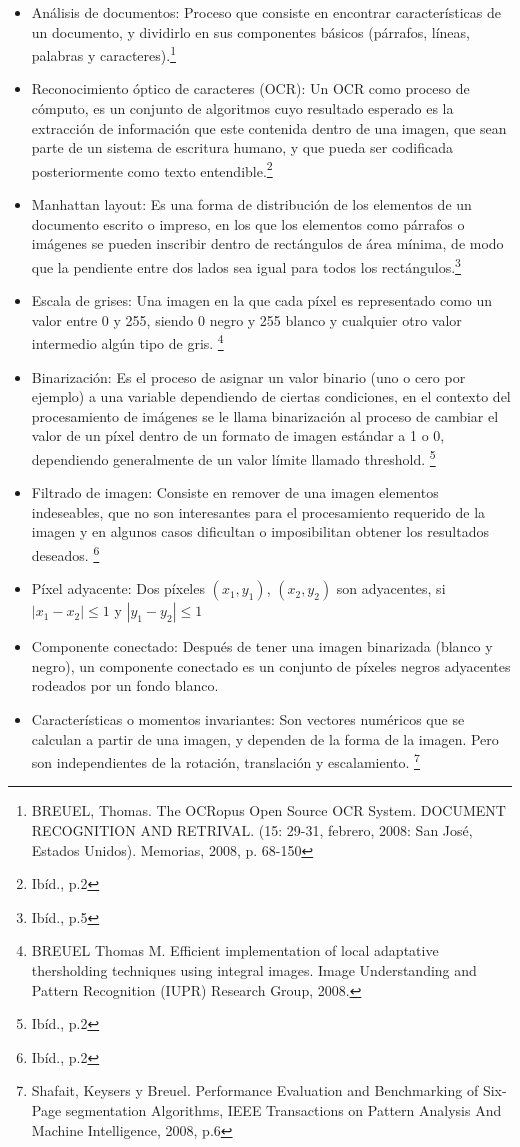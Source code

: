 \documentclass[a4paper, 11pt, oneside]{report}
\begin{document}
\begin{itemize}
\item Análisis de documentos: Proceso que consiste en encontrar características de un documento,
y dividirlo en sus componentes básicos (párrafos, líneas, palabras y caracteres).\footnote{BREUEL,
Thomas. The OCRopus Open Source OCR System. DOCUMENT RECOGNITION AND RETRIVAL. (15: 29-31, febrero,
2008: San José, Estados Unidos). Memorias, 2008, p. 68-150}
\item Reconocimiento óptico de caracteres (OCR): Un OCR como proceso de cómputo, es un conjunto de
algoritmos cuyo resultado esperado es la extracción de información que este contenida dentro de
una imagen, que sean parte de un sistema de escritura humano, y que pueda ser codificada
posteriormente como texto entendible.\footnote{Ibíd., p.2}
\item Manhattan layout: Es una forma de distribución de los elementos de un documento escrito o
impreso, en los que los elementos como párrafos o imágenes se pueden inscribir
dentro de rectángulos de área mínima, de modo que la pendiente entre dos lados sea igual para
todos los rectángulos.\footnote{Ibíd., p.5}
\item Escala de grises: Una imagen en la que cada píxel es representado como un valor entre 0 y
255, siendo 0 negro y 255 blanco y cualquier otro valor intermedio algún tipo de gris. \footnote{
BREUEL Thomas M. Efficient implementation of local adaptative thersholding techniques using integral 
images. Image Understanding and Pattern Recognition (IUPR) Research Group, 2008.}
\item Binarización: Es el proceso de asignar un valor binario (uno o cero por ejemplo) a una
variable dependiendo de ciertas condiciones, en el contexto del procesamiento de imágenes se le
llama binarización al proceso de cambiar el valor de un píxel dentro de un formato de imagen
estándar a 1 o 0, dependiendo generalmente de un valor límite llamado threshold.
\footnote{Ibíd., p.2}
\item Filtrado de imagen: Consiste en remover de una imagen elementos indeseables, que no
son interesantes para el procesamiento requerido de la imagen y en algunos casos dificultan
o imposibilitan obtener los resultados deseados.
\footnote{Ibíd., p.2}
\item Píxel adyacente: Dos píxeles $(x_1,y_1)$, $(x_2,y_2)$ son adyacentes, si $|x_1-x_2| \le 1$
y $|y_1-y_2| \le 1$
\item Componente conectado: Después de tener una imagen binarizada (blanco y negro), un
componente conectado es un conjunto de píxeles negros adyacentes rodeados por un fondo blanco.
\item Características o momentos invariantes: Son vectores numéricos que se calculan a partir
de una imagen, y dependen de la forma de la imagen. Pero son independientes de la rotación,
translación y escalamiento.
\footnote{Shafait, Keysers y Breuel. Performance Evaluation and Benchmarking of Six-Page segmentation
Algorithms, IEEE Transactions on Pattern Analysis And Machine Intelligence, 2008, p.6}
\end{itemize}
\end{document}
